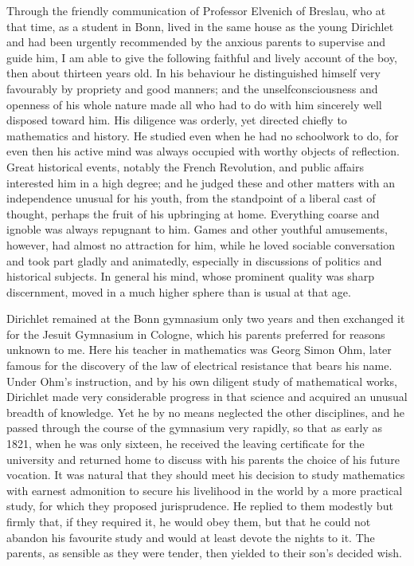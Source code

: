 \documentclass[11pt]{article}
\begin{document}
Through the friendly communication of Professor Elvenich of Breslau, who at that time, as a student in Bonn, lived in the same house as the young Dirichlet and had been urgently recommended by the anxious parents to supervise and guide him, I am able to give the following faithful and lively account of the boy, then about thirteen years old. In his behaviour he distinguished himself very favourably by propriety and good manners; and the unselfconsciousness and openness of his whole nature made all who had to do with him sincerely well disposed toward him. His diligence was orderly, yet directed chiefly to mathematics and history. He studied even when he had no schoolwork to do, for even then his active mind was always occupied with worthy objects of reflection. Great historical events, notably the French Revolution, and public affairs interested him in a high degree; and he judged these and other matters with an independence unusual for his youth, from the standpoint of a liberal cast of thought, perhaps the fruit of his upbringing at home. Everything coarse and ignoble was always repugnant to him. Games and other youthful amusements, however, had almost no attraction for him, while he loved sociable conversation and took part gladly and animatedly, especially in discussions of politics and historical subjects. In general his mind, whose prominent quality was sharp discernment, moved in a much higher sphere than is usual at that age.

Dirichlet remained at the Bonn gymnasium only two years and then exchanged it for the Jesuit Gymnasium in Cologne, which his parents preferred for reasons unknown to me. Here his teacher in mathematics was Georg Simon Ohm, later famous for the discovery of the law of electrical resistance that bears his name. Under Ohm's instruction, and by his own diligent study of mathematical works, Dirichlet made very considerable progress in that science and acquired an unusual breadth of knowledge. Yet he by no means neglected the other disciplines, and he passed through the course of the gymnasium very rapidly, so that as early as 1821, when he was only sixteen, he received the leaving certificate for the university and returned home to discuss with his parents the choice of his future vocation. It was natural that they should meet his decision to study mathematics with earnest admonition to secure his livelihood in the world by a more practical study, for which they proposed jurisprudence. He replied to them modestly but firmly that, if they required it, he would obey them, but that he could not abandon his favourite study and would at least devote the nights to it. The parents, as sensible as they were tender, then yielded to their son's decided wish.
\end{document}

